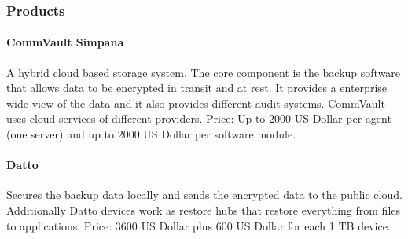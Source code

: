 \subsubsection{Products}
\paragraph{CommVault Simpana} A hybrid cloud based storage system.  The
core component is the backup software that allows data to be encrypted
in transit and at rest. It provides a enterprise wide view of the data
and it also provides different audit systems.  CommVault uses cloud
services of different providers. Price:  Up to 2000 US Dollar per agent
(one server) and up to 2000 US Dollar per software module.

\paragraph{Datto} Secures the backup data locally and sends the
encrypted data to the public cloud. Additionally Datto devices work as
restore hubs that restore everything from files to applications. Price:
3600 US Dollar plus 600 US Dollar for each 1 TB device.
